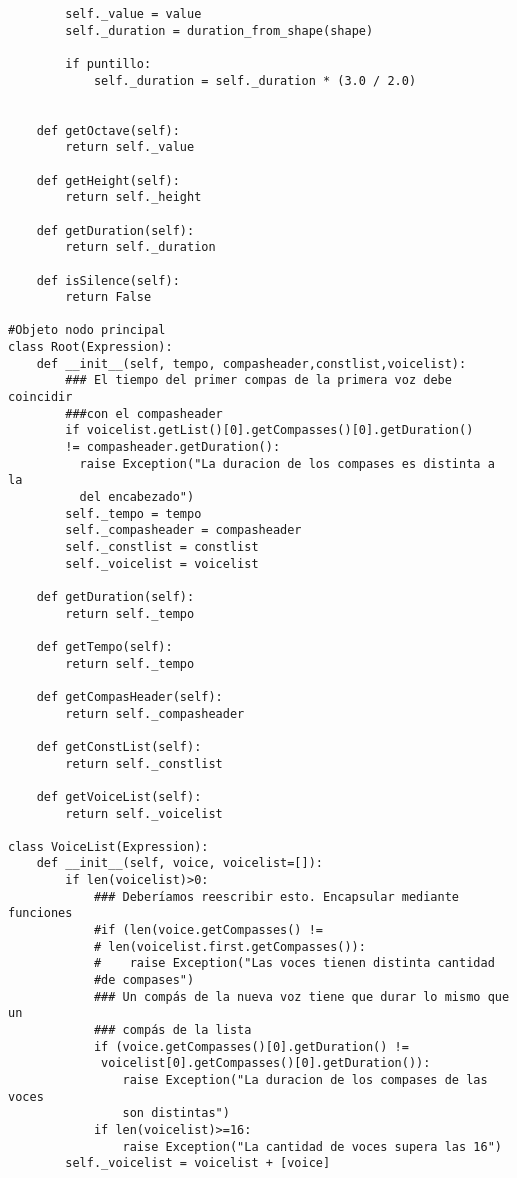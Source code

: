 \begin{verbatim}
        self._value = value
        self._duration = duration_from_shape(shape)

        if puntillo:
            self._duration = self._duration * (3.0 / 2.0)


    def getOctave(self):
        return self._value

    def getHeight(self):
        return self._height

    def getDuration(self):
        return self._duration

    def isSilence(self):
        return False

#Objeto nodo principal
class Root(Expression):
    def __init__(self, tempo, compasheader,constlist,voicelist):
        ### El tiempo del primer compas de la primera voz debe coincidir 
        ###con el compasheader
        if voicelist.getList()[0].getCompasses()[0].getDuration() 
        != compasheader.getDuration():
          raise Exception("La duracion de los compases es distinta a la 
          del encabezado")
        self._tempo = tempo
        self._compasheader = compasheader
        self._constlist = constlist
        self._voicelist = voicelist

    def getDuration(self):
        return self._tempo

    def getTempo(self):
        return self._tempo

    def getCompasHeader(self):
        return self._compasheader

    def getConstList(self):
        return self._constlist

    def getVoiceList(self):
        return self._voicelist

class VoiceList(Expression):
    def __init__(self, voice, voicelist=[]):
        if len(voicelist)>0:
            ### Deberíamos reescribir esto. Encapsular mediante funciones
            #if (len(voice.getCompasses() !=
            # len(voicelist.first.getCompasses()):
            #    raise Exception("Las voces tienen distinta cantidad 
            #de compases")
            ### Un compás de la nueva voz tiene que durar lo mismo que un 
            ### compás de la lista
            if (voice.getCompasses()[0].getDuration() !=
             voicelist[0].getCompasses()[0].getDuration()):
                raise Exception("La duracion de los compases de las voces 
                son distintas")
            if len(voicelist)>=16:
            	raise Exception("La cantidad de voces supera las 16")
        self._voicelist = voicelist + [voice]


\end{verbatim}
